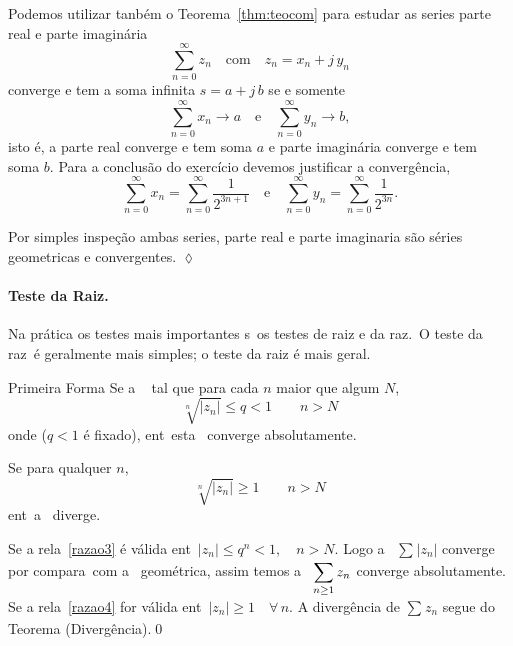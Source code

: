 Podemos utilizar tanbém  o Teorema~\ref{thm:teocom} para estudar as series parte real e parte imaginária
\begin{equation*}
 \sum_{n=0}^{\infty} z_{n} \quad \text{com}\quad  z_{n}= x_{n}+j\, y_{n}
\end{equation*}
 converge e tem a soma infinita \(s=a+j\,b\) se e somente 
 \begin{equation*}
\sum_{n=0}^{\infty}x_{n} \to a \quad \text{e}\quad \sum_{n=0}^{\infty}y_{n} \to b,
 \end{equation*}
 isto é, a parte real converge e tem soma \(a\) e parte imaginária converge e tem soma \(b\). Para a conclusão
 do exercício devemos justificar a convergência,
\begin{equation*}
\sum_{n=0}^{\infty}x_{n}=\sum_{n=0}^{\infty}\dfrac{1}{2^{3n+1}} \quad \text{e}\quad
\sum_{n=0}^{\infty}y_{n}=\sum_{n=0}^{\infty}\dfrac{1}{2^{3n}}.
\end{equation*}

Por simples inspeção ambas series, parte real e parte imaginaria são séries geometricas e convergentes.
\hfill \(\lozenge\)

\paragraph{Teste da Raiz.}  Na pr\'{a}tica os testes mais importantes s\ao\ os testes de raiz e da raz\ao.\ O teste da raz\ao\ \'e
geralmente mais simples; o teste da raiz \'e mais geral.

\begin{theoc}{Primeira Forma}{}
Se a \ser\  tal que  para cada $n$ maior que algum
$N$,
\begin{equation}\label{razao3}
\sqrt[n]{|z_n|}\leq q <1\qquad n>N
\end{equation}
onde ($q<1$ \'e fixado), ent\ao\ esta \ser\ converge
absolutamente.

Se para qualquer $n$,
\begin{equation}\label{razao4}
\sqrt[n]{|z_n|}\geq 1\qquad n>N
\end{equation}
ent\ao\ a \ser\ diverge.
\end{theoc}

\prova Se a rela\cao\ \eqref{razao3} \'e v\'{a}lida ent\ao\ $|z_n|\leq
q^n<1,\quad n>N$. Logo a \ser\ $\sum_{}|z_{n}|$
converge por compara\cao\ com a \ser\ geom\'etrica, assim temos a
\ser\ $\displaystyle{\sum_{n\geq 1}z_n}$ converge absolutamente. Se a
rela\cao\ \eqref{razao4} for v\'{a}lida ent\ao\ $|z_n|\geq 1\quad
\forall\, n$. A diverg\^encia  de $\sum_{}z_{n}$ segue
do Teorema (Diverg\^encia).\qed

